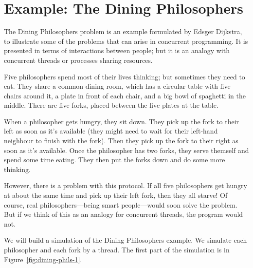 \section{Example: The Dining Philosophers}

The Dining Philosophers problem is an example formulated by Edsger Dijkstra,
to illustrate some of the problems that can arise in concurrent programming.  
It is presented in terms of interactions between people; but it is an analogy
with concurrent threads or processes sharing resources. 

Five philosophers spend most of their lives thinking; but sometimes they need
to eat.  They share a common dining room, which has a circular table with five
chairs around it, a plate in front of each chair, and a big bowl of spaghetti
in the middle.  There are five forks, placed between the five plates at the
table.

When a philosopher gets hungry, they sit down.  They pick up the fork to their
left as soon as it's available (they might need to wait for their left-hand
neighbour to finish with the fork).  Then they pick up the fork to their right
as soon as it's available.  Once the philosopher has two forks, they serve
themself and spend some time eating.  They then put the forks down and do
some more thinking.

However, there is a problem with this protocol.  If all five philosophers get
hungry at about the same time and pick up their left fork, then they all
starve!  Of course, real philosophers---being smart people---would soon solve
the problem.  But if we think of this as an analogy for concurrent threads,
the program would not.  

We will build a simulation of the Dining Philosophers example.  We 
simulate each philosopher and each fork by a thread.  The first part of the
simulation is in Figure~\ref{fig:dining-phils-1}.


